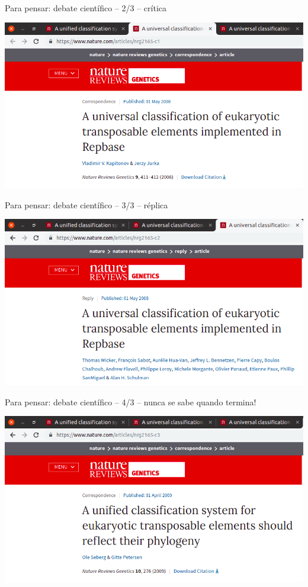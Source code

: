 \documentclass{beamer}
\begin{document}
\begin{frame}{\tiny Para pensar: debate científico -- 2/3 -- crítica}
  \begin{center}
    \includegraphics[width=\textwidth]{Encerramento/polemica2}
  \end{center}
\end{frame}

\begin{frame}{\tiny Para pensar: debate científico -- 3/3 -- réplica}
  \begin{center}
    \includegraphics[width=\textwidth]{Encerramento/polemica3}
  \end{center}
\end{frame}

\begin{frame}{\tiny Para pensar: debate científico -- 4/3 -- nunca se sabe quando termina!}
  \begin{center}
    \includegraphics[width=\textwidth]{Encerramento/polemica4}
  \end{center}
\end{frame}
\end{document}
